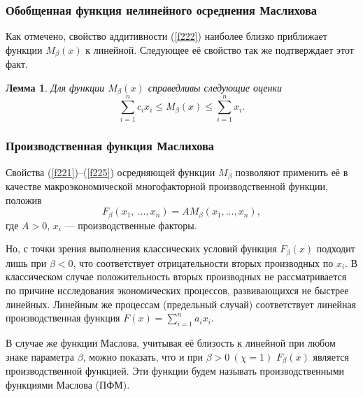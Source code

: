 \documentclass[10pt, pdf, hyperref={unicode}]{beamer}
\newtheorem{lem}{\hspace{5mm} Лемма}
\begin{document}
    \begin{frame}
        \frametitle{Обобщенная функция нелинейного осреднения Маслихова}
        \begin{center}
            \begin{minipage}[h]{0.97\linewidth}
                Как отмечено, свойство аддитивности (\ref{f222}) наиболее близко приближает
                функции $ M_\beta (x)$ к линейной. Следующее её свойство так же
                подтверждает этот факт.

                \begin{lem}%
                Для функции $ M_\beta(x)$ справедливы следующие оценки
                \begin{equation}\label{f227}
                \sum\limits^n_{i=1} c_i x_i \leq  M_\beta(x) \leq
                \sum\limits^n_{i=1}  x_i. %
                \end{equation}
                \end{lem}
            \end{minipage}
        \end{center}
    \end{frame}

    \begin{frame}
        \frametitle{Производственная функция Маслихова}
        \begin{center}
            \begin{minipage}[h]{0.97\linewidth}
                Свойства (\ref{f221})--(\ref{f225}) осредняющей функции $M_\beta$ позволяют
                применить её в качестве макроэкономической многофакторной
                производственной функции, положив
                \begin{equation}\label{f231}
                F_\beta (x_1, \ \ldots, x_n) = A M_\beta(x_1,\ldots, x_n), %
                \end{equation}
                где $A>0$, $x_i$ --- производственные факторы.
                
                Но, с точки зрения выполнения классических условий функция $F_\beta(x)$ подходит лишь при $\beta<0$,
                что соответствует отрицательности вторых производных по $x_i$.
                В классическом случае положительность вторых производных не рассматривается по причине исследования экономических процессов,
                развивающихся не быстрее линейных. Линейным же процессам (предельный случай) соответствует линейная производственная функция
                $F(x)=\sum\limits_{i=1}^n  a_i x_i$.
                
                В случае же функции Маслова, учитывая её близость к линейной при любом знаке параметра $\beta$, можно показать,
                что и при $\beta>0 \ (\chi=1)$ $F_\beta(x)$ является производственной функцией. Эти функции будем называть производственными функциями Маслова (ПФМ).
            \end{minipage}
        \end{center}
    \end{frame}
\end{document}
